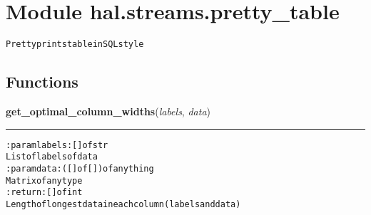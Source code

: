 %
%
%


\section{Module hal.streams.pretty\_table}

    \label{hal:streams:pretty_table}
\begin{alltt}
Pretty prints table in SQL style 
\end{alltt}



  \subsection{Functions}

    \label{hal:streams:pretty_table:get_optimal_column_widths}

    \vspace{0.5ex}

\hspace{.8\funcindent}\begin{boxedminipage}{\funcwidth}

    \raggedright \textbf{get\_optimal\_column\_widths}(\textit{labels}, \textit{data})

    \vspace{-1.5ex}

    \rule{\textwidth}{0.5\fboxrule}
\setlength{\parskip}{2ex}
\begin{alltt}

:param labels: [] of str
    List of labels of data
:param data: ([] of []) of anything
    Matrix of any type
:return: [] of int
    Length of longest data in each column (labels and data)
\end{alltt}

\setlength{\parskip}{1ex}
    \end{boxedminipage}

